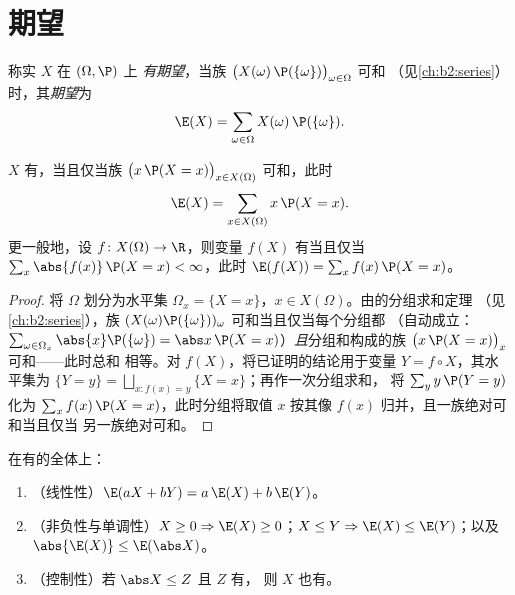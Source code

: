 \section{期望}

\begin{definition}[期望]\label{def:b2:randomvar:expectation}
称实 $X$ 在 $(\Omega, \P)$ 上
\emph{有期望}，当族
$\bigl(X(\omega)\,\P(\{\omega\})\bigr)_{\omega \in \Omega}$ 可和
（见\cref{ch:b2:series}）时，其\emph{期望}为
\[
\E(X) = \sum_{\omega \in \Omega} X(\omega)\,\P(\{\omega\}) .
\]
\end{definition}

\begin{theorem}[转移定理]\label{thm:b2:randomvar:transfer}
$X$ 有，当且仅当族 $\bigl(x\,\P(X =
x)\bigr)_{x \in X(\Omega)}$ 可和，此时
\[
\E(X) = \sum_{x \in X(\Omega)} x\,\P(X = x) .
\]
更一般地，设 $f \colon X(\Omega) \to \R$，则变量
$f(X)$ 有当且仅当 $\sum_x \abs{f(x)}\,\P(X = x) <
\infty$，此时 $\E(f(X)) = \sum_x f(x)\,\P(X = x)$。
\end{theorem}

\begin{proof}
将 $\Omega$ 划分为水平集 $\Omega_x = \{X = x\}$，$x
\in X(\Omega)$。由的分组求和定理
（见\cref{ch:b2:series}），族
$(X(\omega)\P(\{\omega\}))_\omega$ 可和当且仅当每个分组都
（自动成立：$\sum_{\omega \in \Omega_x}\abs{x}\P(\{\omega\}) =
\abs x\,\P(X = x)$）\emph{且}分组和构成的族
$\bigl(x\,\P(X = x)\bigr)_x$ 可和——此时总和
相等。对 $f(X)$，将已证明的结论用于变量 $Y =
f \circ X$，其水平集为 $\{Y = y\} =
\bigsqcup_{x : f(x) = y}\{X = x\}$；再作一次分组求和，
将 $\sum_y y\,\P(Y = y)$ 化为 $\sum_x
f(x)\,\P(X = x)$，此时分组将取值 $x$
按其像 $f(x)$ 归并，且一族绝对可和当且仅当
另一族绝对可和。
\end{proof}

\begin{theorem}[期望的性质]\label{thm:b2:randomvar:linearity}
在有的全体上：
\begin{enumerate}
\item （线性性）$\E(aX + bY) = a\,\E(X) + b\,\E(Y)$。
\item （非负性与单调性）$X \geq 0 \Rightarrow \E(X)
\geq 0$；$X \leq Y \Rightarrow \E(X) \leq \E(Y)$；以及
$\abs{\E(X)} \leq \E(\abs X)$。
\item （控制性）若 $\abs X \leq Z$ 且 $Z$ 有，
则 $X$ 也有。
\end{enumerate}
\end{theorem}

